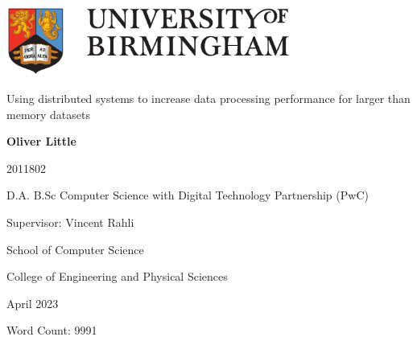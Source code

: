 \begin{titlepage}
	\begin{center}
		\vspace*{1cm}
		
		\includegraphics[width=0.7\textwidth]{uob-logo.eps}
		
		\vspace{1.5cm}
		
		\huge
		Using distributed systems to increase data processing performance for larger than memory datasets
		
		
		
		\vspace{2cm}
		
		\large
		\textbf{Oliver Little}
		
		\vspace{0.25cm}
		
		\small 2011802
		
		\vspace{0.25cm}
		
		\large
		D.A. B.Sc Computer Science with Digital Technology Partnership (PwC)
		
		\vspace{1.5cm}
		
		Supervisor: Vincent Rahli
		
		\vspace{1.5cm}
		
		\large
		School of Computer Science
		
		\large
		College of Engineering and Physical Sciences
		
		\large
		April 2023
		
		\vspace{1.5cm}
		
		\normalsize
		Word Count: 9991
		
	\end{center}
\end{titlepage}